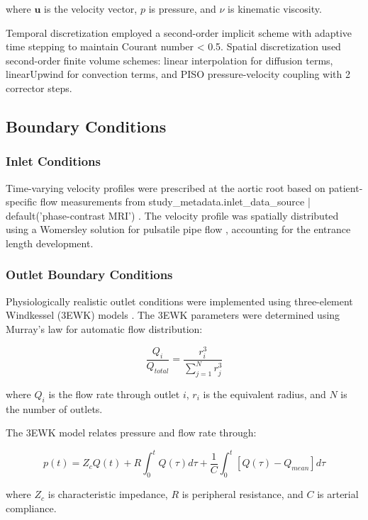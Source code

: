 where $\mathbf{u}$ is the velocity vector, $p$ is pressure, and $\nu$ is kinematic viscosity.

Temporal discretization employed a second-order implicit scheme with adaptive time stepping to maintain Courant number < 0.5. Spatial discretization used second-order finite volume schemes: linear interpolation for diffusion terms, linearUpwind for convection terms, and PISO pressure-velocity coupling with 2 corrector steps.

\subsection{Boundary Conditions}

\subsubsection{Inlet Conditions}
Time-varying velocity profiles were prescribed at the aortic root based on patient-specific flow measurements from {{ study_metadata.inlet_data_source | default('phase-contrast MRI') }}. The velocity profile was spatially distributed using a Womersley solution for pulsatile pipe flow \cite{ref_womersley}, accounting for the entrance length development.

\subsubsection{Outlet Boundary Conditions}
Physiologically realistic outlet conditions were implemented using three-element Windkessel (3EWK) models \cite{ref_windkessel}. The 3EWK parameters were determined using Murray's law for automatic flow distribution:

\begin{equation}
\frac{Q_i}{Q_{total}} = \frac{r_i^3}{\sum_{j=1}^{N} r_j^3}
\end{equation}

where $Q_i$ is the flow rate through outlet $i$, $r_i$ is the equivalent radius, and $N$ is the number of outlets.

The 3EWK model relates pressure and flow rate through:

\begin{equation}
p(t) = Z_c Q(t) + R \int_0^t Q(\tau) d\tau + \frac{1}{C} \int_0^t [Q(\tau) - Q_{mean}] d\tau
\end{equation}

where $Z_c$ is characteristic impedance, $R$ is peripheral resistance, and $C$ is arterial compliance.

